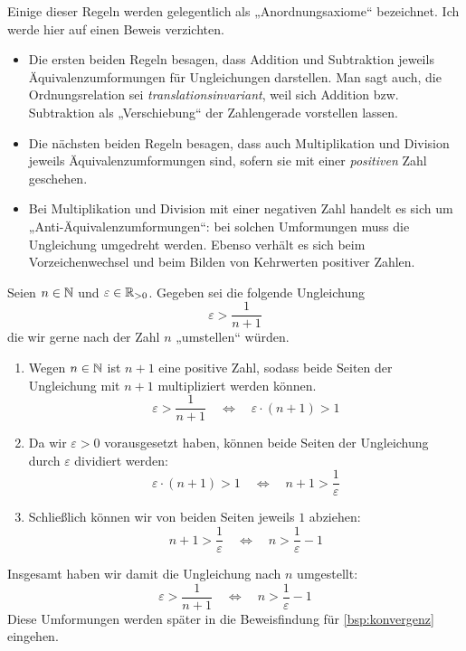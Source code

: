 \begin{bem} \label{ungleichungerklaerung}
    Einige dieser Regeln werden gelegentlich als „Anordnungsaxiome“ bezeichnet. Ich werde hier auf einen Beweis verzichten.%
    \begin{itemize}
        \item Die ersten beiden Regeln besagen, dass Addition und Subtraktion jeweils Äquivalenz\-umformungen für Ungleichungen darstellen. Man sagt auch, die Ordnungsrelation sei \emph{translationsinvariant}, weil sich Addition bzw. Subtraktion als „Verschiebung“ der Zahlengerade vorstellen lassen.
        \item Die nächsten beiden Regeln besagen, dass auch Multiplikation und Division jeweils Äquivalenzumformungen sind, sofern sie mit einer \emph{positiven} Zahl geschehen.
        \item Bei Multiplikation und Division mit einer negativen Zahl handelt es sich um „Anti-Äquivalenzumformungen“: bei solchen Umformungen muss die Ungleichung umgedreht werden. Ebenso verhält es sich beim Vorzeichenwechsel und beim Bilden von Kehrwerten positiver Zahlen.
    \end{itemize}
\end{bem}


\begin{bsp} \label{bsp:ungleichungumstellen}
    Seien $n\in \mathbb N$ und $\varepsilon \in \mathbb R_{>0}$. Gegeben sei die folgende Ungleichung
        \[ \varepsilon > \frac{1}{n+1} \]
    die wir gerne nach der Zahl $n$ „umstellen“ würden.
    \begin{enumerate}
        \item Wegen $n\in \mathbb N$ ist $n+1$ eine positive Zahl, sodass beide Seiten der Ungleichung mit $n+1$ multipliziert werden können.
            \[ \varepsilon  > \frac{1}{n+1} \quad\iff\quad \varepsilon \cdot (n+1) > 1\]
        \item Da wir $\varepsilon>0$ vorausgesetzt haben, können beide Seiten der Ungleichung durch $\varepsilon$ dividiert werden:
            \[ \varepsilon \cdot (n+1) > 1 \quad\iff\quad n+1 > \frac{1}{\varepsilon} \]
        \item Schließlich können wir von beiden Seiten jeweils $1$ abziehen:
            \[ n+1 > \frac{1}{\varepsilon} \quad\iff\quad n > \frac{1}{\varepsilon}-1 \]
    \end{enumerate}
    Insgesamt haben wir damit die Ungleichung nach $n$ umgestellt:
        \[ \varepsilon > \frac{1}{n+1} \quad\iff\quad n > \frac{1}{\varepsilon}-1 \]
    Diese Umformungen werden später in die Beweisfindung für \cref{bsp:konvergenz} eingehen.
\end{bsp}


